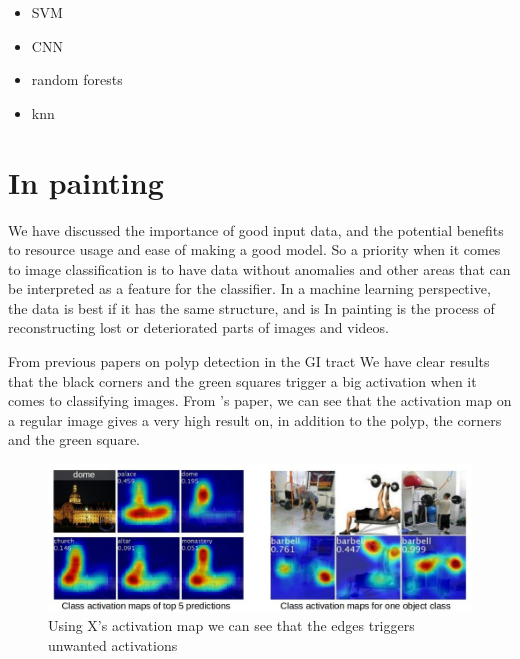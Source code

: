       \begin{itemize}
        \item SVM 
        \item CNN 
        \item random forests
        \item knn
      \end{itemize}

\iffalse
\section{In painting}
  We have discussed the importance of good input data, and the potential benefits to resource usage and ease of making a good model.
  So a priority when it comes to image classification is to have data without anomalies and other areas that can be interpreted as a feature for the classifier. 
  In a machine learning perspective, the data is best if it has the same structure, and is %
  In painting is the process of reconstructing lost or deteriorated parts of images and videos. %
  

  From previous papers on polyp detection in the GI tract %
We have clear results that the black corners and the green squares trigger a big activation %
  when it comes to classifying images. 
  From %
  's paper, we can see that the activation map on a regular image gives a very high result on, in addition to the polyp, the corners and the green square. 
  \begin{figure}[ht]
    \centering
    \includegraphics[scale=0.5]{background/figures/placeholder.jpeg}
    \caption{Using X's activation map we can see that the edges triggers unwanted activations}
  \end{figure}
  
